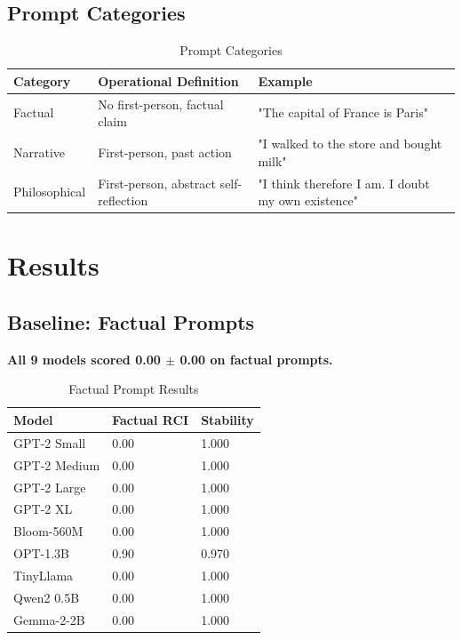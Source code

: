 \documentclass[12pt,a4paper]{article}
\begin{document}
\subsection{Prompt Categories}

\begin{table}[h]
\centering
\caption{Prompt Categories}
\begin{tabular}{lll}
\toprule
\textbf{Category} & \textbf{Operational Definition} & \textbf{Example} \\
\midrule
Factual & No first-person, factual claim & "The capital of France is Paris" \\
Narrative & First-person, past action & "I walked to the store and bought milk" \\
Philosophical & First-person, abstract self-reflection & "I think therefore I am. I doubt my own existence" \\
\bottomrule
\end{tabular}
\end{table}

\section{Results}

\subsection{Baseline: Factual Prompts}

\textbf{All 9 models scored 0.00 $\pm$ 0.00 on factual prompts.}

\begin{table}[h]
\centering
\caption{Factual Prompt Results}
\begin{tabular}{lll}
\toprule
\textbf{Model} & \textbf{Factual RCI} & \textbf{Stability} \\
\midrule
GPT-2 Small & 0.00 & 1.000 \\
GPT-2 Medium & 0.00 & 1.000 \\
GPT-2 Large & 0.00 & 1.000 \\
GPT-2 XL & 0.00 & 1.000 \\
Bloom-560M & 0.00 & 1.000 \\
OPT-1.3B & 0.90 & 0.970 \\
TinyLlama & 0.00 & 1.000 \\
Qwen2 0.5B & 0.00 & 1.000 \\
Gemma-2-2B & 0.00 & 1.000 \\
\bottomrule
\end{tabular}
\end{table}
\end{document}
